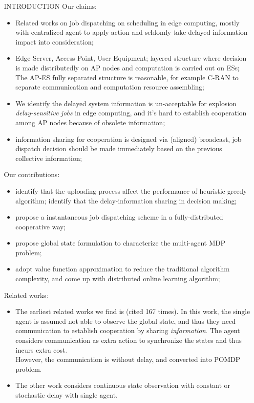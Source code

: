 \documentclass[10pt, conference, letterpaper]{IEEEtran}
\begin{document}
    \begin{section}{INTRODUCTION}
        \label{sec:introduction}
        Our claims:
        \begin{itemize}
            \item Related works on job dispatching on scheduling in edge computing, mostly with centralized agent to apply action and seldomly take delayed information impact into consideration;
            \item Edge Server, Access Point, User Equipment; layered structure where decision is made distributedly on AP nodes and computation is carried out on ESs; The AP-ES fully separated structure is reasonable, for example C-RAN to separate communication and computation resource assembling;
            \item We identify the delayed system information is un-acceptable for explosion \emph{delay-sensitive jobs} in edge computing, and it's hard to establish cooperation among AP nodes because of obsolete information;
            \item information sharing for cooperation is designed via (aligned) broadcast, job dispatch decision should be made immediately based on the previous collective information;
        \end{itemize}

        Our contributions:
        \begin{itemize}
            \item identify that the uploading process affect the performance of heuristic greedy algorithm; identify that the delay-information sharing in decision making;
            \item propose a instantaneous job dispatching scheme in a fully-distributed cooperative way;
            \item propose global state formulation to characterize the multi-agent MDP problem;
            \item adopt value function approximation to reduce the traditional algorithm complexity, and come up with distributed online learning algorithm;
        \end{itemize}

        Related works:
        \begin{itemize}
            \item The earliest related works we find is \cite{ref-01} (cited 167 times). In this work, the single agent is assumed not able to observe the global state, and thus they need communication to establish cooperation by sharing \emph{information}. The agent considers communication as extra action to synchronize the states and thus incurs extra cost. \\
            However, the communication is without delay, and converted into POMDP problem.
            \item The other work \cite{ref-02} considers continuous state observation with constant or stochastic delay with single agent.
        \end{itemize}


\end{section}
\end{document}
